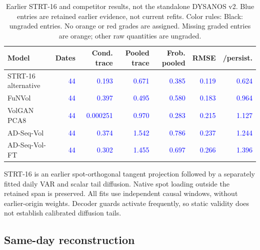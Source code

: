 \documentclass[11pt]{article}
\begin{document}
\begin{table}[H]\centering\small\setlength{\tabcolsep}{4pt}
\caption{Earlier STRT-16 and competitor results, not the standalone DYSANOS v2. Blue entries are retained earlier evidence, not current refits. Color rules: Black: ungraded entries. No orange or red grades are assigned. Missing graded entries are orange; other raw quantities are ungraded.}\label{tab:current-covariance}
\begin{tabular}{@{}lrrrrrr@{}}
\toprule
Model & Dates & Cond. trace & Pooled trace & Frob. pooled & RMSE & /persist. \\
\midrule
STRT-16 alternative & \textcolor{blue}{44} & \textcolor{blue}{0.193} & \textcolor{blue}{0.671} & \textcolor{blue}{0.385} & \textcolor{blue}{0.119} & \textcolor{blue}{0.624} \\
FuNVol & \textcolor{blue}{44} & \textcolor{blue}{0.397} & \textcolor{blue}{0.495} & \textcolor{blue}{0.580} & \textcolor{blue}{0.183} & \textcolor{blue}{0.964} \\
VolGAN PCA8 & \textcolor{blue}{44} & \textcolor{blue}{0.000251} & \textcolor{blue}{0.970} & \textcolor{blue}{0.283} & \textcolor{blue}{0.215} & \textcolor{blue}{1.127} \\
AD-Seq-Vol & \textcolor{blue}{44} & \textcolor{blue}{0.374} & \textcolor{blue}{1.542} & \textcolor{blue}{0.786} & \textcolor{blue}{0.237} & \textcolor{blue}{1.244} \\
AD-Seq-Vol-FT & \textcolor{blue}{44} & \textcolor{blue}{0.302} & \textcolor{blue}{1.455} & \textcolor{blue}{0.697} & \textcolor{blue}{0.266} & \textcolor{blue}{1.396} \\
\bottomrule\end{tabular}\end{table}

STRT-16 is an earlier spot-orthogonal tangent projection followed by a separately fitted daily VAR and scalar tail diffusion. Native spot loading outside the retained span is preserved. All fits use independent causal windows, without earlier-origin weights. Decoder guards activate frequently, so static validity does not establish calibrated diffusion tails.

\subsection{Same-day reconstruction}
\end{document}
